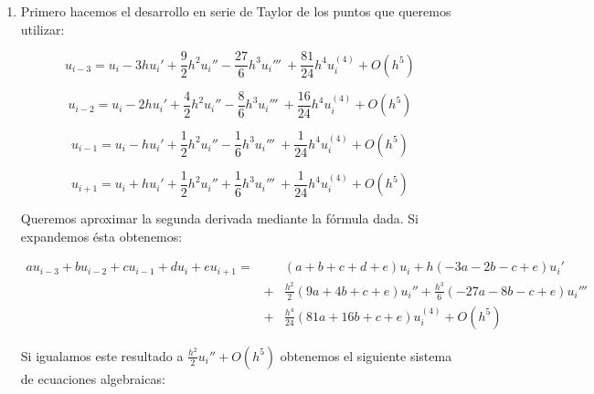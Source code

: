 \documentclass{article}
\begin{document}
\begin{enumerate}[1)]
    \item{ %
        Primero hacemos el desarrollo en serie de Taylor de los puntos que queremos utilizar:

        \[ u_{i-3} = u_i - 3 h u_i' + \frac{9}{2} h^2 u_i'' - \frac{27}{6} h^3 u_i''' \
                     + \frac{81}{24} h^4 u_i^{(4)} + O(h^5) \]

        \[ u_{i-2} = u_i - 2 h u_i' + \frac{4}{2} h^2 u_i'' - \frac{8}{6} h^3 u_i''' \
                     + \frac{16}{24} h^4 u_i^{(4)} + O(h^5) \]

        \[ u_{i-1} = u_i - h u_i' + \frac{1}{2} h^2 u_i'' - \frac{1}{6} h^3 u_i''' \
                     + \frac{1}{24} h^4 u_i^{(4)} + O(h^5) \]

        \[ u_{i+1} = u_i + h u_i' + \frac{1}{2} h^2 u_i'' + \frac{1}{6} h^3 u_i''' \
                     + \frac{1}{24} h^4 u_i^{(4)} + O(h^5) \]

        Queremos aproximar la segunda derivada mediante la fórmula dada. Si expandemos ésta obtenemos:

        \begin{eqnarray*}
            a u_{i-3} + b u_{i-2} + c u_{i-1} + d u_i + e u_{i+1} = &&(a+b+c+d+e) u_i + h (-3a -2b -c + e) u_i' \\
                                &+& \frac{h^2}{2} (9a + 4b + c + e) u_i'' + \frac{h^3}{6} (-27a -8b-c+e) u_i''' \\ 
                                &+& \frac{h^4}{24} (81a+16b+c+e) u_i^{(4)} + O(h^5)
        \end{eqnarray*}

        Si igualamos este resultado a $\frac{h^2}{2} u_i'' + O(h^5)$ obtenemos el siguiente sistema de ecuaciones
        algebraicas:

}
\end{enumerate}
\end{document}
